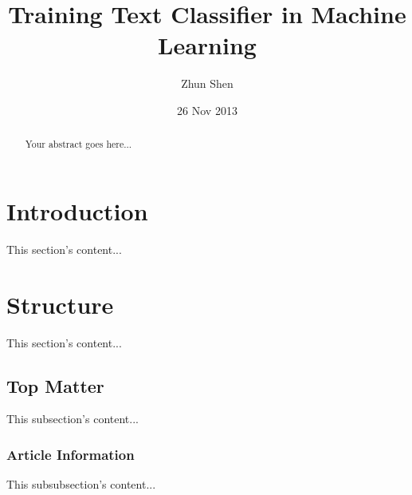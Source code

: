 \documentclass[11pt,a4paper]{report}
\begin{document}
\title{Training Text Classifier in Machine Learning}
\author{Zhun Shen}
\date{26 Nov 2013}

\maketitle
\begin{abstract}
Your abstract goes here...
\end{abstract}

\section{Introduction}
This section's content...

\section{Structure}
This section's content...

\subsection{Top Matter}
This subsection's content...

\subsubsection{Article Information}
This subsubsection's content...
\end{document}
